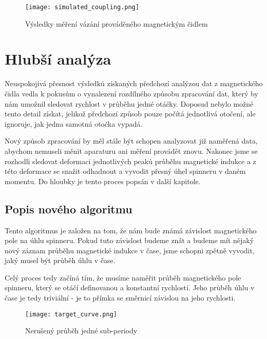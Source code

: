 \begin{figure}[!ht]
    \texttt{[image: simulated\_coupling.png]}
    \centering
    \caption{Výsledky měření vázání prováděného magnetickým čidlem}
    \label{fig:mag_coupling_vernier}
\end{figure}

\section{Hlubší analýza}

Neuspokojivá přesnost výsledků získaných předchozí analýzou dat z magnetického čidla vedla k pokusům o vynalezení rozdílného způsobu zpracování dat, který by nám umožnil sledovat rychlost v průběhu jedné otáčky. Doposud nebylo možné tento detail získat, jelikož předchozí způsob pouze počítá jednotlivá otočení, ale ignoruje, jak jedna samotná otočka vypadá.

Nový způsob zpracování by měl stále být schopen analyzovat již naměřená data, abychom nemuseli měnit aparaturu ani měření provádět znovu. Nakonec jsme se rozhodli sledovat deformaci jednotlivých peaků průběhu magnetické indukce a z této deformace se snažit odhadnout a vyvodit přesný úhel spinneru v daném momentu. Do hloubky je tento proces popsán v další kapitole.

\clearpage
\subsection{Popis nového algoritmu}

Tento algoritmus je založen na tom, že nám bude známá závislost magnetického pole na úhlu spinneru. Pokud tuto závislost budeme znát a budeme mít nějaký nový záznam průběhu magnetické indukce v čase, jsme schopni zpětně vyvodit, jaký musel být průběh úhlu v čase.

Celý proces tedy začíná tím, že musíme naměřit průběh magnetického pole spinneru, který se otáčí definovanou a konstantní rychlostí. Jeho průběh úhlu v čase je tedy triviální - je to přímka se směrnicí závislou na jeho rychlosti.

\begin{wrapfigure}{r}{0.5\textwidth}
    \texttt{[image: target\_curve.png]}
    \centering
    \caption{Nerušený průběh jedné sub-periody}
    \label{fig:target_curve}
\end{wrapfigure}

